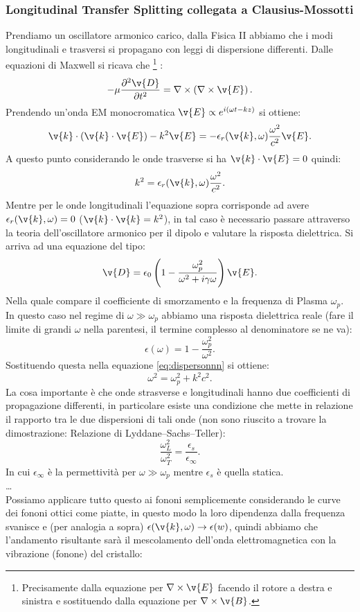 \subsubsection{Longitudinal Transfer Splitting collegata a Clausius-Mossotti}%
\label{subsub:Longitudinal Transfer Splitting collegata a Clausius-Mossotti}
Prendiamo un oscillatore armonico carico, dalla Fisica II abbiamo che i modi longitudinali e trasversi si propagano con leggi di dispersione differenti. Dalle equazioni di Maxwell si ricava che
\footnote{Precisamente dalla equazione per $\nabla \times \v{E}$ facendo il rotore a destra e sinistra e sostituendo dalla equazione per $\nabla \times \v{B}$.}
:
\[
    -\mu \frac{\partial ^2\v{D}}{\partial t^2} = \nabla \times \left(\nabla \times \v{E}\right)
.\] 
Prendendo un'onda EM monocromatica $\v{E} \propto e^{i\left(\omega t-kz\right)}$ si ottiene:
\[
    \v{k}\cdot \left(\v{k}\cdot \v{E}\right)-k^2\v{E}=-\epsilon_r(\v{k},\omega) \frac{\omega^2}{c^2}\v{E}
.\] 
A questo punto considerando le onde trasverse si ha $\v{k}\cdot \v{E}=0$ quindi:
\[
    k^2=\epsilon_r(\v{k},\omega) \frac{\omega^2}{c^2} \label{eq:dispersonnn}
.\] 
Mentre per le onde longitudinali l'equazione sopra corrisponde ad avere $\epsilon_r(\v{k},\omega) =0$ ($\v{k}\cdot \v{k}=k^2$), in tal caso è necessario passare attraverso la teoria dell'oscillatore armonico per il dipolo e valutare la risposta dielettrica. Si arriva ad una equazione del tipo:
\[
    \v{D}=\epsilon_0\left(1-\frac{\omega_p^2}{\omega^2+i\gamma\omega}\right)\v{E}
.\] 
Nella quale compare il coefficiente di smorzamento e la frequenza di Plasma $\omega_p$. In questo caso nel regime di $\omega\gg \omega_p$ abbiamo una risposta dielettrica reale (fare il limite di grandi $\omega$ nella parentesi, il termine complesso al denominatore se ne va):
\[
    \epsilon (\omega) = 1-\frac{\omega_p^2}{\omega^2}
.\] 
Sostituendo questa nella equazione \ref{eq:dispersonnn} si ottiene:
\[
    \omega^2=\omega^2_p+k^2c^2
.\] 
La cosa importante è che onde strasverse e longitudinali hanno due coefficienti di propagazione differenti, in particolare esiste una condizione che mette in relazione il rapporto tra le due dispersioni di tali onde (non sono riuscito a trovare la dimostrazione: Relazione di Lyddane–Sachs–Teller):
\[
    \frac{\omega_L^2}{\omega_T^2} = \frac{\epsilon_s}{\epsilon_\infty}
.\] 
In cui $\epsilon_\infty$ è la permettività per $\omega\gg \omega_p$ mentre $\epsilon_s$ è quella statica. \\
\ldots\\
Possiamo applicare tutto questo ai fononi semplicemente considerando le curve dei fononi ottici come piatte, in questo modo la loro dipendenza dalla frequenza svanisce e (per analogia a sopra) $\epsilon (\v{k},\omega) \to \epsilon (w)$, quindi abbiamo che l'andamento risultante sarà il mescolamento dell'onda elettromagnetica con la vibrazione (fonone) del cristallo:
